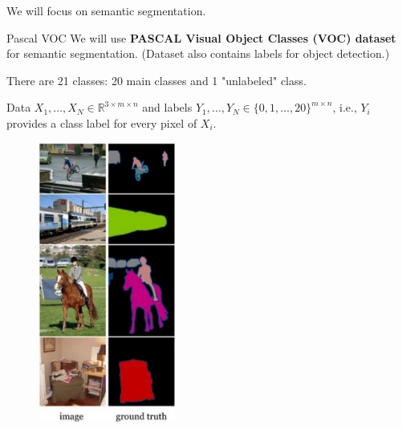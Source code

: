 \begin{frame}[allowframebreaks]

We will focus on semantic segmentation.

\end{frame}

\begin{frame}[allowframebreaks]

\begin{mydefinitionblock}{8.23}{Pascal VOC}
    We will use \textbf{PASCAL Visual Object Classes (VOC) dataset} for semantic segmentation.
    (Dataset also contains labels for object detection.)

    There are 21 classes: 20 main classes and 1 "unlabeled" class.

    Data $X_{1}, \ldots, X_{N} \in \mathbb{R}^{3 \times m \times n}$ and labels $Y_{1}, \ldots, Y_{N} \in\{0,1, \ldots, 20\}^{m \times n}$, i.e., $Y_{i}$ provides a class label for every pixel of $X_{i}$.

    \begin{figure}[H]
        \centering
        \includegraphics[width=0.4\textwidth]{.././assets/8.24.png}
    \end{figure}
\end{mydefinitionblock}

\end{frame}

